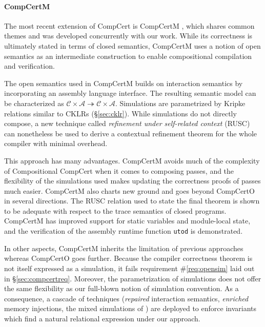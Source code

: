 \documentclass[sigplan,screen,review]{acmart}
\begin{document}

\paragraph{CompCertM} %

The most recent extension of CompCert is CompCertM \cite{compcertm},
which shares common themes and was developed concurrently
with our work.
While its correctness
is ultimately stated in terms of closed semantics,
CompCertM uses a notion of open semantics
as an intermediate construction
to enable compositional compilation and verification.

The open semantics used in CompCertM
builds on interaction semantics
by incorporating an assembly language interface.
The resulting semantic model can be characterized as
$\mathcal{C} \times \mathcal{A} \twoheadrightarrow
 \mathcal{C} \times \mathcal{A}$.
Simulations
are parametrized by Kripke relations similar to CKLRs (\S\ref{sec:cklr}).
While simulations do not directly compose,
a new technique called \emph{refinement under self-related context}
(RUSC)
can nonetheless be used to derive a contextual refinement theorem
for the whole compiler with minimal overhead.

This approach has many advantages.
CompCertM avoids much of the complexity
of Compositional CompCert
when it comes to composing passes,
and the flexibility of the simulations used
makes updating the correctness proofs of passes much easier.
CompCertM also charts new ground
and goes beyond CompCertO
in several directions.
The RUSC relation used to state the final theorem
is shown to be adequate with respect to the trace semantics
of closed programs.
CompCertM has improved support for static variables
and module-local state,
and the verification of
the assembly runtime function \texttt{utod} is demonstrated.

In other aspects, CompCertM inherits the limitation of previous
approaches whereas CompCertO goes further.  Because the compiler
correctness theorem is not itself expressed as a simulation, it fails
requirement \#\ref{req:opensim} laid out in \S\ref{sec:compcertreq}.
Moreover, the parametrization of simulations does not offer the same
flexibility as our full-blown notion of simulation convention.  As a
consequence, a cascade of techniques (\emph{repaired} interaction
semantics, \emph{enriched} memory injections, the mixed simulations of
\cite{pilsner}) are deployed to enforce invariants which find a
natural relational expression under our approach.
\end{document}
